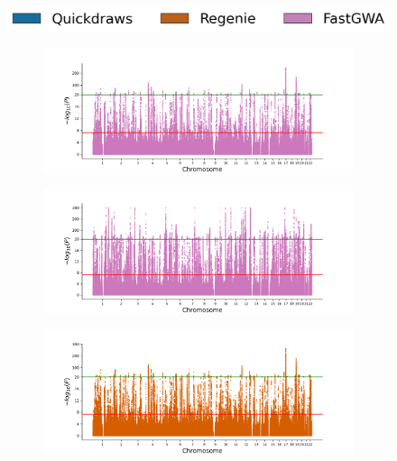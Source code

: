 \begin{figure}[h!]
    \centering
    \includegraphics[scale=0.425]{figures/manhattan_quant/legend.png}
    \begin{subfigure}{.5\textwidth}
    \includegraphics[width=\textwidth]{figures/manhattan_quant/imputed_fastgwa8.png}
    \end{subfigure}%
    \begin{subfigure}{.5\textwidth}
    \includegraphics[width=\textwidth]{figures/manhattan_quant/imputed_fastgwa12.png}
    \end{subfigure}
    \begin{subfigure}{.5\textwidth}
    \includegraphics[width=\textwidth]{figures/manhattan_quant/regenie_400k_Lymphocyte_percentage.regenie.png}
    \end{subfigure}%
    \begin{subfigure}{.5\textwidth}

\end{subfigure}
\end{figure}
